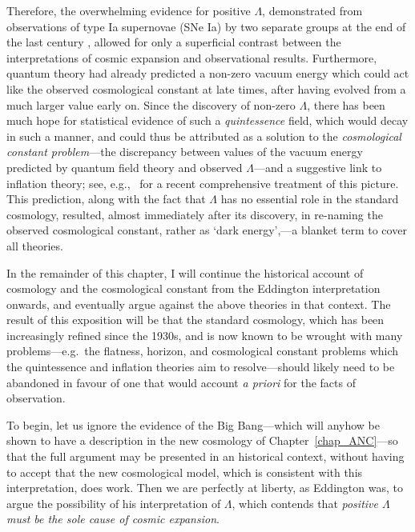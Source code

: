 Therefore, the overwhelming evidence for positive $\Lambda$, demonstrated from observations of type Ia supernovae (SNe Ia) by two separate groups at the end of the last century \cite{Riess1998,Perlmutter1999}, allowed for only a superficial contrast between the interpretations of cosmic expansion and observational results. Furthermore, quantum theory had already predicted a non-zero vacuum energy which could act like the observed cosmological constant at late times, after having evolved from a much larger value early on. Since the discovery of non-zero $\Lambda$, there has been much hope for statistical evidence of such a \textit{quintessence} field, which would decay in such a manner, and could thus be attributed as a solution to the \textit{cosmological constant problem}---the discrepancy between values of the vacuum energy predicted by quantum field theory and observed $\Lambda$---and a suggestive link to inflation theory; see, e.g.,~\cite{Weinberg2008} for a recent comprehensive treatment of this picture. This prediction, along with the fact that $\Lambda$ has no essential role in the standard cosmology, resulted, almost immediately after its discovery, in re-naming the observed cosmological constant, rather as `dark energy',---a blanket term to cover all theories.

In the remainder of this chapter, I will continue the historical account of cosmology and the cosmological constant from the Eddington interpretation onwards, and eventually argue against the above theories in that context. The result of this exposition will be that the standard cosmology, which has been increasingly refined since the 1930s, and is now known to be wrought with many problems---e.g.~the flatness, horizon, and cosmological constant problems which the quintessence and inflation theories aim to resolve---should likely need to be abandoned in favour of one that would account \textit{a priori} for the facts of observation. 

To begin, let us ignore the evidence of the Big Bang---which will anyhow be shown to have a description in the new cosmology of Chapter~\ref{chap_ANC}---so that the full argument may be presented in an historical context, without having to accept that the new cosmological model, which is consistent with this interpretation, does work. Then we are perfectly at liberty, as Eddington was, to argue the possibility of his interpretation of $\Lambda$, which contends that \textit{positive $\Lambda$ must be the sole cause of cosmic expansion}. 

